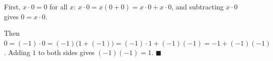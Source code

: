 First, $x\cdot0=0$ for all $x$: $x\cdot0=x(0+0)=x\cdot0+x\cdot0$, and subtracting $x\cdot0$ gives $0=x\cdot0$.

Then $0=(-1)\cdot0=(-1)\bigl(1+(-1)\bigr)=(-1)\cdot1+(-1)(-1)=-1+(-1)(-1)$. Adding $1$ to both sides gives $(-1)(-1)=1$. $\blacksquare$
